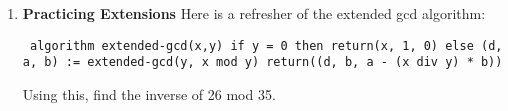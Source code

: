 \documentclass[11pt]{article}
\newif\ifsolutions
\begin{document}
\begin{enumerate}
\item {\bf Practicing Extensions} Here is a refresher of the extended gcd algorithm:

{\obeylines \tt
algorithm extended-gcd(x,y)
\quad if y = 0 then return(x, 1, 0)
\quad else
\quad\quad (d, a, b) := extended-gcd(y, x mod y)
\quad\quad return((d, b, a - (x div y) * b))}

Using this, find the inverse of 26 mod 35.

\ifsolutions
\newpage
 {\bf solutions:} 

extended-gcd(35, 26) \\
\tab extended-gcd(26, 9) \\
\tab \tab extended-gcd(9, 8) \\
\tab \tab \tab extended-gcd(8, 1) \\
\tab \tab \tab \tab extended-gcd(1, 0) \\
\tab \tab\tab \tab returns (1, 1, 0) \\
\tab \tab \tab returns (1, 0, 1- (8 div 1) $*$0) = (1,0,1)  \\
\tab \tab returns (1, 1, 0 - (9 div 8)$*$1) = (1,1,-1) \\
\tab returns (1, -1, 1 - (26 div 9)$*$-1) = (1, -1, 3) \\
returns (1, 3, -1 - (35 div 26)$*$3) = (1,3, -4) \\

This means that $1 = 3*35 -4*26$.

This means that $26^{-1} \bmod{35} \equiv -4 \bmod{35} \equiv 31 \bmod{35}$


\fi
%
%
%
%


\end{enumerate}
\end{document}
